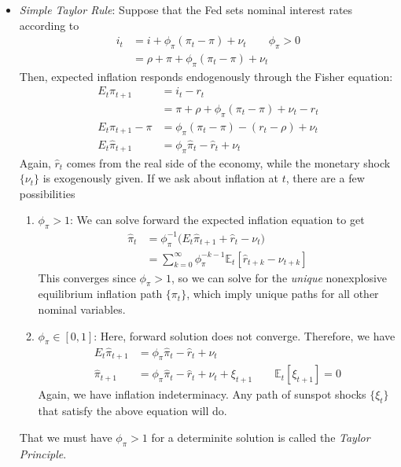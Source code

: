 \documentclass[12pt]{article}
\theoremstyle{plain}
\theoremstyle{definition}
\theoremstyle{remark}
\newcommand{\E}{\mathbb{E}}
\begin{document}
\begin{itemize}
  \item
    \emph{Simple Taylor Rule}:
    Suppose that the Fed sets nominal interest rates according to
    \begin{align*}
      i_t &= i + \phi_\pi(\pi_t-\pi) + \nu_t
      \qquad \phi_\pi > 0
      \\
      &= \rho + \pi + \phi_\pi(\pi_t-\pi) + \nu_t
    \end{align*}
    Then, expected inflation responds endogenously through the Fisher
    equation:
    \begin{align*}
      E_t\pi_{t+1} &=
      i_t - r_t
      \\
      &=
      \pi + \rho + \phi_\pi(\pi_t-\pi) + \nu_t - r_t
      \\
      E_t\pi_{t+1} -\pi
      &= \phi_\pi(\pi_t-\pi) - (r_t -\rho) + \nu_t \\
      E_t\hat{\pi}_{t+1}
      &= \phi_\pi\hat{\pi}_t - \hat{r}_t + \nu_t
    \end{align*}
    Again, $\hat{r}_t$ comes from the real side of the economy, while
    the monetary shock $\{\nu_t\}$ is exogenously given. If we ask about
    inflation at $t$, there are a few possibilities
    \begin{enumerate}[label=(\roman*)]
      \item $\phi_\pi>1$: We can solve forward the expected inflation
        equation to get
        \begin{align*}
          \hat{\pi}_t
          &=
          \phi_\pi^{-1}
          \big(
          E_t\hat{\pi}_{t+1} + \hat{r}_t - \nu_t
          \big) \\
          &=
          \sum_{k=0}^\infty
          \phi_\pi^{-k-1}
          \E_t[\hat{r}_{t+k}-\nu_{t+k}]
        \end{align*}
        This converges since $\phi_\pi>1$, so we can solve for the
        \emph{unique} nonexplosive equilibrium inflation path
        $\{\pi_t\}$, which imply unique paths for all other nominal
        variables.

      \item $\phi_\pi\in[0,1]$: Here, forward solution does not
        converge. Therefore, we have
        \begin{align*}
          E_t\hat{\pi}_{t+1}
          &= \phi_\pi\hat{\pi}_t - \hat{r}_t + \nu_t \\
          \hat{\pi}_{t+1}
          &= \phi_\pi\hat{\pi}_t - \hat{r}_t + \nu_t + \xi_{t+1}
          \qquad\E_t[\xi_{t+1}]=0
        \end{align*}
        Again, we have inflation indeterminacy. Any path of sunspot
        shocks $\{\xi_t\}$ that satisfy the above equation will do.
    \end{enumerate}
    That we must have $\phi_\pi>1$ for a determinite solution is called
    the \emph{Taylor Principle}.
\end{itemize}
\end{document}
